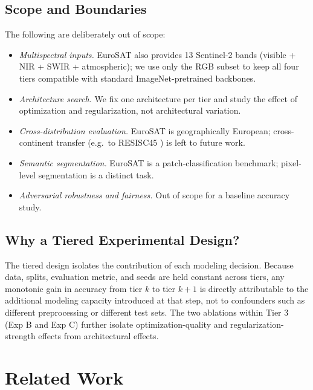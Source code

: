 \documentclass[10pt,letterpaper]{article}
\begin{document}
\subsection{Scope and Boundaries}
The following are deliberately out of scope:
\begin{itemize}[leftmargin=2em]
    \item \emph{Multispectral inputs.} EuroSAT also provides 13 Sentinel-2 bands (visible + NIR + SWIR + atmospheric); we use only the RGB subset to keep all four tiers compatible with standard ImageNet-pretrained backbones.
    \item \emph{Architecture search.} We fix one architecture per tier and study the effect of optimization and regularization, not architectural variation.
    \item \emph{Cross-distribution evaluation.} EuroSAT is geographically European; cross-continent transfer (e.g.\ to RESISC45 \cite{cheng2017}) is left to future work.
    \item \emph{Semantic segmentation.} EuroSAT is a patch-classification benchmark; pixel-level segmentation is a distinct task.
    \item \emph{Adversarial robustness and fairness.} Out of scope for a baseline accuracy study.
\end{itemize}

\subsection{Why a Tiered Experimental Design?}
The tiered design isolates the contribution of each modeling decision. Because data, splits, evaluation metric, and seeds are held constant across tiers, any monotonic gain in accuracy from tier $k$ to tier $k{+}1$ is directly attributable to the additional modeling capacity introduced at that step, not to confounders such as different preprocessing or different test sets. The two ablations within Tier 3 (Exp B and Exp C) further isolate optimization-quality and regularization-strength effects from architectural effects.

\section{Related Work}
\label{sec:related}
\end{document}
